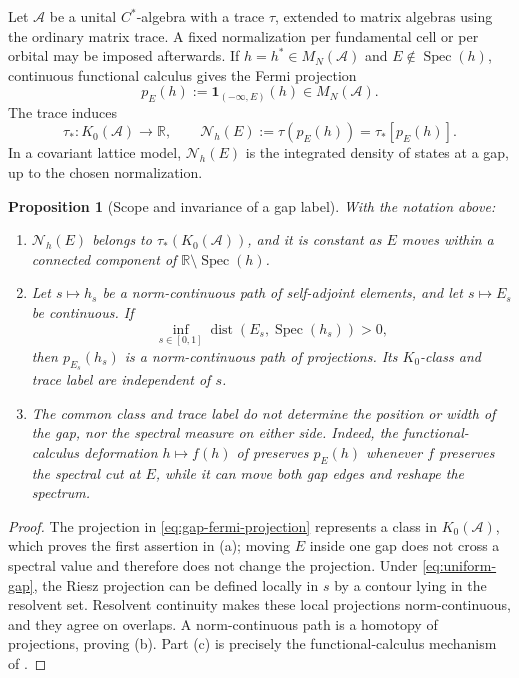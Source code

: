 \documentclass[11pt]{article}
\newtheorem{proposition}[theorem]{Proposition}
\theoremstyle{definition}
\theoremstyle{remark}
\newcommand{\RR}{\mathbb R}
\newcommand{\spec}{\operatorname{Spec}}
\begin{document}
Let \(\mathcal A\) be a unital \(C^*\)-algebra with a trace \(\tau\), extended
to matrix algebras using the ordinary matrix trace.  A fixed normalization per
fundamental cell or per orbital may be imposed afterwards.  If
\(h=h^*\in M_N(\mathcal A)\) and \(E\notin\spec(h)\), continuous functional
calculus gives the Fermi projection
\[
             p_E(h):=\mathbf1_{(-\infty,E)}(h)\in M_N(\mathcal A).
             \tag{9.5}\label{eq:gap-fermi-projection}
\]
The trace induces
\[
     \tau_*:K_0(\mathcal A)\longrightarrow\RR,
     \qquad
     \mathcal N_h(E):=\tau\!\left(p_E(h)\right)
                     =\tau_*[p_E(h)].
     \tag{9.6}\label{eq:trace-pairing}
\]
In a covariant lattice model, \(\mathcal N_h(E)\) is the integrated density
of states at a gap, up to the chosen normalization.

\begin{proposition}[Scope and invariance of a gap label]
\label{prop:gap-label-scope}
With the notation above:
\begin{enumerate}[label=\textup{(\alph*)},leftmargin=2.5em]
\item \(\mathcal N_h(E)\) belongs to
  \(\tau_*(K_0(\mathcal A))\), and it is constant as \(E\) moves within a
  connected component of \(\RR\setminus\spec(h)\).

\item Let \(s\mapsto h_s\) be a norm-continuous path of self-adjoint elements,
  and let \(s\mapsto E_s\) be continuous.  If
  \[
       \inf_{s\in[0,1]}
       \operatorname{dist}\!\left(E_s,\spec(h_s)\right)>0,
       \tag{9.7}\label{eq:uniform-gap}
  \]
  then \(p_{E_s}(h_s)\) is a norm-continuous path of projections.  Its
  \(K_0\)-class and trace label are independent of \(s\).

\item The common class and trace label do not determine the position or width
  of the gap, nor the spectral measure on either side.  Indeed, the
  functional-calculus deformation \(h\mapsto f(h)\) of
   preserves \(p_E(h)\) whenever \(f\)
  preserves the spectral cut at \(E\), while it can move both gap edges and
  reshape the spectrum.
\end{enumerate}
\end{proposition}

\begin{proof}
The projection in \eqref{eq:gap-fermi-projection} represents a class in
\(K_0(\mathcal A)\), which proves the first assertion in (a); moving \(E\)
inside one gap does not cross a spectral value and therefore does not change
the projection.  Under \eqref{eq:uniform-gap}, the Riesz projection can be
defined locally in \(s\) by a contour lying in the resolvent set.  Resolvent
continuity makes these local projections norm-continuous, and they agree on
overlaps.  A norm-continuous path is a homotopy of projections, proving (b).
Part (c) is precisely the functional-calculus mechanism of
.
\end{proof}
\end{document}

